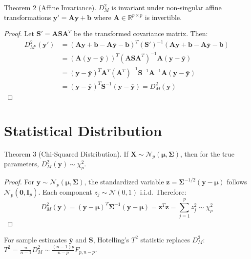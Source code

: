 \documentclass{article}
\begin{document}
Theorem 2 (Affine Invariance).
$D_M^2$ is invariant under non-singular affine transformations $\mathbf{y}' = \mathbf{A}\mathbf{y} + \mathbf{b}$ where $\mathbf{A} \in \mathbb{R}^{p \times p}$ is invertible.

\begin{proof}
Let $\mathbf{S}' = \mathbf{A}\mathbf{S}\mathbf{A}^T$ be the transformed covariance matrix. Then:
\begin{align*}
    D_{M'}^2(\mathbf{y}') &= (\mathbf{A}\mathbf{y} + \mathbf{b} - \mathbf{A}\bar{\mathbf{y}} - \mathbf{b})^T (\mathbf{S}')^{-1} (\mathbf{A}\mathbf{y} + \mathbf{b} - \mathbf{A}\bar{\mathbf{y}} - \mathbf{b}) \\
    &= (\mathbf{A}(\mathbf{y} - \bar{\mathbf{y}}))^T (\mathbf{A}\mathbf{S}\mathbf{A}^T)^{-1} \mathbf{A}(\mathbf{y} - \bar{\mathbf{y}}) \\
    &= (\mathbf{y} - \bar{\mathbf{y}})^T \mathbf{A}^T (\mathbf{A}^T)^{-1}\mathbf{S}^{-1}\mathbf{A}^{-1} \mathbf{A}(\mathbf{y} - \bar{\mathbf{y}}) \\
    &= (\mathbf{y} - \bar{\mathbf{y}})^T \mathbf{S}^{-1} (\mathbf{y} - \bar{\mathbf{y}}) = D_M^2(\mathbf{y})
\end{align*}
\end{proof}

\section*{Statistical Distribution}

Theorem 3 (Chi-Squared Distribution).
If $\mathbf{X} \sim \mathcal{N}_p(\boldsymbol{\mu}, \mathbf{\Sigma})$, then for the true parameters, $D_M^2(\mathbf{y}) \sim \chi^2_p$.

\begin{proof}
For $\mathbf{y} \sim \mathcal{N}_p(\boldsymbol{\mu}, \mathbf{\Sigma})$, the standardized variable $\mathbf{z} = \mathbf{\Sigma}^{-1/2}(\mathbf{y} - \boldsymbol{\mu})$ follows $\mathcal{N}_p(\mathbf{0}, \mathbf{I}_p)$. Each component $z_j \sim \mathcal{N}(0,1)$ i.i.d. Therefore:
\begin{equation*}
    D_M^2(\mathbf{y}) = (\mathbf{y} - \boldsymbol{\mu})^T \mathbf{\Sigma}^{-1} (\mathbf{y} - \boldsymbol{\mu}) = \mathbf{z}^T\mathbf{z} = \sum_{j=1}^p z_j^2 \sim \chi^2_p
\end{equation*}
\end{proof}

For sample estimates $\bar{\mathbf{y}}$ and $\mathbf{S}$, Hotelling's $T^2$ statistic replaces $D_M^2$: $T^2 = \frac{n}{n-1}D_M^2 \sim \frac{(n-1)p}{n-p}F_{p,n-p}$.
\end{document}
